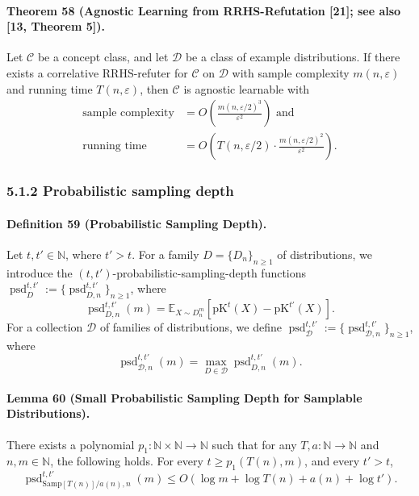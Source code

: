\documentclass[10pt,a4paper]{article}
\begin{document}
\paragraph{Theorem 58 (Agnostic Learning from RRHS-Refutation [21]; see also [13, Theorem 5]).} Let $\mathcal C$ be a concept class, and let $\mathcal D$ be a class of example distributions. If there exists a correlative RRHS-refuter for $\mathcal C$ on $\mathcal D$ with sample complexity $m(n,\varepsilon)$ and running time $T(n,\varepsilon)$, then $\mathcal C$ is agnostic learnable with
\begin{align*}
\text{sample complexity}&=O\left(\frac{m(n,\varepsilon/2)^3}{\varepsilon^2}\right)\text{ and}\\
\text{running time}&=O\left(T(n,\varepsilon/2)\cdot\frac{m(n,\varepsilon/2)^2}{\varepsilon^2}\right).
\end{align*}
\subsubsection*{5.1.2 Probabilistic sampling depth}
\paragraph{Definition 59 (Probabilistic Sampling Depth).} Let $t,t'\in\mathbb N$, where $t'>t$. For a family $D=\{D_n\}_{n\geq1}$ of distributions, we introduce the $(t,t')$-probabilistic-sampling-depth functions $\operatorname{psd}_D^{t,t'}:=\{\operatorname{psd}_{D,n}^{t,t'}\}_{n\geq1}$, where
\[\operatorname{psd}_{D,n}^{t,t'}(m)=\mathbb E_{X\sim D_n^m}[\mathrm{pK}^t(X)-\mathrm{pK}^{t'}(X)].\]
For a collection $\mathcal D$ of families of distributions, we define $\operatorname{psd}_{\mathcal D}^{t,t'}:=\{\operatorname{psd}_{\mathcal D,n}^{t,t'}\}_{n\geq1}$, where
\[\operatorname{psd}_{\mathcal D,n}^{t,t'}(m)=\max_{D\in\mathcal D}\operatorname{psd}_{D,n}^{t,t'}(m).\]
\paragraph{Lemma 60 (Small Probabilistic Sampling Depth for Samplable Distributions).} There exists a polynomial $p_1:\mathbb N\times\mathbb N\to\mathbb N$ such that for any $T,a:\mathbb N\to\mathbb N$ and $n,m\in\mathbb N$, the following holds. For every $t\geq p_1(T(n),m)$, and every $t'>t$,
\[\operatorname{psd}_{\mathrm{Samp}[T(n)]/a(n),n}^{t,t'}(m)\leq O(\log m+\log T(n)+a(n)+\log t').\]
\end{document}
